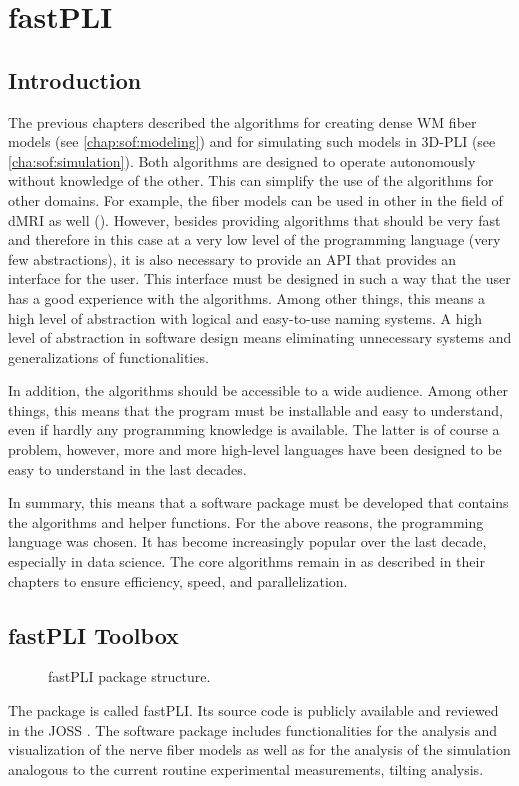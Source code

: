 \cleardoublepage
\setcounter{chapter}{6}
\chapter{\acs{fastPLI}}
\label{chap:Software}
% 
% 
% 
\section{Introduction}\label{sec:fastpliIntro}
%
The previous chapters described the algorithms for creating dense \ac{WM} fiber models (see \cref{chap:sof:modeling}) and for simulating such models in \ac{3D-PLI} (see \cref{cha:sof:simulation}).
Both algorithms are designed to operate autonomously without knowledge of the other.
This can simplify the use of the algorithms for other domains. For example, the fiber models can be used in other in the field of \ac{dMRI} as well (\cite{Ginsburger2019,ginsburgerDis2019}).
However, besides providing algorithms that should be very fast and therefore in this case at a very low level of the programming language (very few abstractions), it is also necessary to provide an API that provides an interface for the user.
This interface must be designed in such a way that the user has a good experience with the algorithms.
Among other things, this means a high level of abstraction with logical and easy-to-use naming systems.
A high level of abstraction in software design means eliminating unnecessary systems and generalizations of functionalities.
\par
%
In addition, the algorithms should be accessible to a wide audience.
Among other things, this means that the program must be installable and easy to understand, even if hardly any programming knowledge is available.
The latter is of course a problem, however, more and more high-level languages have been designed to be easy to understand in the last decades.
\par
%
In summary, this means that a software package must be developed that contains the algorithms and helper functions.
For the above reasons, the \python{} programming language was chosen.
It has become increasingly popular over the last decade, especially in data science.
The core algorithms remain in \cpp{} as described in their chapters to ensure efficiency, speed, and parallelization.
%
% 
% 
\section{fastPLI Toolbox}
%
\begin{figure}[!ht]
\centering
{}
\caption{\acs{fastPLI} package structure.}
\label{fig:fastpli}
\end{figure}
%
The \python{} package is called  \ac{fastPLI}.
Its source code is publicly available and reviewed in the \ac{JOSS} \cite{fastpli,Matuschke2021}.
The software package includes functionalities for the analysis and visualization of the nerve fiber models as well as for the analysis of the simulation analogous to the current routine experimental measurements, \eg{} tilting analysis.
%
%
%
